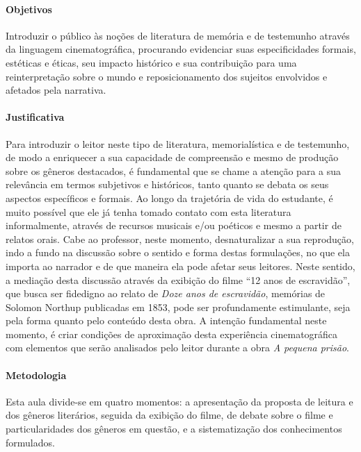\documentclass[11pt]{extarticle}
\begin{document}
\paragraph{Objetivos} Introduzir o público às noções de literatura de
memória e de testemunho através da linguagem cinematográfica, procurando
evidenciar suas especificidades formais, estéticas e éticas, seu impacto
histórico e sua contribuição para uma reinterpretação sobre o mundo e
reposicionamento dos sujeitos envolvidos e afetados pela narrativa.

\paragraph{Justificativa} Para introduzir o leitor neste tipo de
literatura, memorialística e de testemunho, de modo a enriquecer a sua
capacidade de compreensão e mesmo de produção sobre os gêneros
destacados, é fundamental que se chame a atenção para a sua relevância
em termos subjetivos e históricos, tanto quanto se debata os seus
aspectos específicos e formais. Ao longo da trajetória de vida do
estudante, é muito possível que ele já tenha tomado contato com esta
literatura informalmente, através de recursos musicais e/ou poéticos e
mesmo a partir de relatos orais. Cabe ao professor, neste momento,
desnaturalizar a sua reprodução, indo a fundo na discussão sobre o
sentido e forma destas formulações, no que ela importa ao narrador e de
que maneira ela pode afetar seus leitores. Neste sentido, a mediação
desta discussão através da exibição do filme ``12 anos de escravidão'',
que busca ser fidedigno ao relato de \emph{Doze anos de escravidão},
memórias de Solomon Northup publicadas em 1853, pode ser profundamente
estimulante, seja pela forma quanto pelo conteúdo desta obra. A intenção
fundamental neste momento, é criar condições de aproximação desta
experiência cinematográfica com elementos que serão analisados pelo
leitor durante a obra \emph{A pequena prisão}.

\paragraph{Metodologia} Esta aula divide-se em quatro momentos: a
apresentação da proposta de leitura e dos gêneros literários, seguida da
exibição do filme, de debate sobre o filme e particularidades dos
gêneros em questão, e a sistematização dos conhecimentos formulados.
\end{document}

